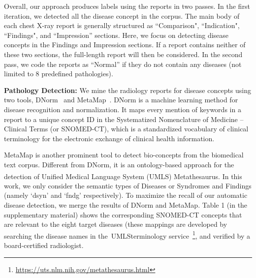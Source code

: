 \documentclass[10pt,twocolumn,letterpaper]{article}
\newcommand{\umls}{UMLS\textsuperscript{\textregistered}}
\begin{document}

Overall, our approach produces labels using the reports in two passes. In the first iteration, we detected all the disease concept in the corpus. The main body of each chest X-ray report is generally structured as ``Comparison", ``Indication", ``Findings", and ``Impression'' sections. Here, we focus on detecting disease concepts in the Findings and Impression sections. If a report contains neither of these two sections, the full-length report will then be considered. In the second pass, we code the reports as ``Normal'' if they do not contain any diseases (not limited to 8 predefined pathologies). 

{\bf Pathology Detection:} 
We mine the radiology reports for disease concepts using two tools, DNorm~\cite{leaman2015challenges} and MetaMap~\cite{aronson2010overview}. DNorm is a machine learning method for disease recognition and normalization. It maps every mention of keywords in a report to a unique concept ID in the Systematized Nomenclature of Medicine – Clinical Terms (or SNOMED-CT), which is a standardized vocabulary of clinical terminology for the electronic exchange of clinical health information.

MetaMap is another prominent tool to detect bio-concepts from the biomedical text corpus. Different from DNorm, it is an ontology-based approach for the detection of Unified Medical Language System\textsuperscript{\textregistered} (\umls) Metathesaurus. In this work, we only consider the semantic types of Diseases or Syndromes and Findings (namely `dsyn' and `fndg' respectively). To maximize the recall of our automatic disease detection, we merge the results of DNorm and MetaMap. Table 1 (in the supplementary material) shows the corresponding SNOMED-CT concepts that are relevant to the eight target diseases (these mappings are developed by searching the disease names in the~\umls terminology service~\footnote{\url{https://uts.nlm.nih.gov/metathesaurus.html}}, and verified by a board-certified radiologist.
\end{document}
